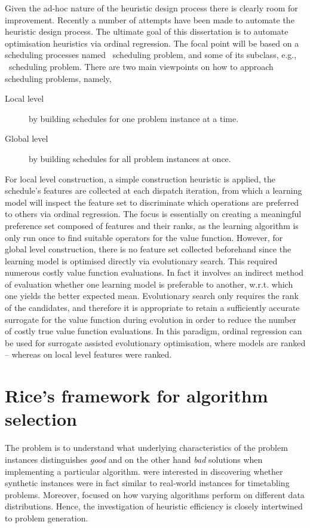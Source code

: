 Given the ad-hoc nature of the heuristic design process there is clearly room 
for improvement. Recently a number of attempts have been made to automate the 
heuristic design process. 
The ultimate goal of this dissertation is to automate optimisation heuristics via ordinal regression. 
The focal point will be based on a scheduling processes named \jsp\ scheduling problem, and some of its subclass, e.g., \fsp\ scheduling problem.
There are two main viewpoints on how to approach scheduling problems, namely,	
\begin{description}
	\item[Local level] by building schedules for one problem instance at a time.
	\item[Global level] by building schedules for all problem instances at once.
\end{description}
For local level construction, a simple construction heuristic is applied, the 
schedule's features are collected at each dispatch iteration, from which a 
learning model will inspect the feature set to discriminate which operations 
are preferred to others via ordinal regression. The focus is essentially on 
creating a meaningful preference set composed of features and their ranks, as 
the learning algorithm is only run once to find suitable operators for the 
value function. 
However, for global level construction, there is no feature set collected beforehand since the learning model is optimised directly via evolutionary search. This required numerous costly value function evaluations. In fact it involves an indirect method of evaluation whether one learning model is preferable to another, w.r.t. which one yields the better expected mean. 
Evolutionary search only requires the rank of the candidates, and therefore it 
is appropriate to retain a sufficiently accurate surrogate for the value 
function during evolution in order to reduce the number of costly true value 
function evaluations. In this paradigm, ordinal regression can be used for 
surrogate assisted evolutionary optimisation, where models are ranked -- 
whereas on local level features were ranked. 

\section{Rice's framework for algorithm selection}\label{sec:rice}
The problem is to understand what underlying characteristics of the problem 
instances distinguishes \emph{good} and on the other hand \emph{bad} solutions 
when implementing a particular algorithm. \citet{SmithMilesLion5} were 
interested in discovering whether synthetic instances were in fact similar to 
real-world instances for timetabling problems. Moreover,  
\citeauthor{SmithMilesLion5} focused on how varying algorithms perform 
on different data distributions. Hence, the investigation of heuristic 
efficiency is closely intertwined to problem generation. 

